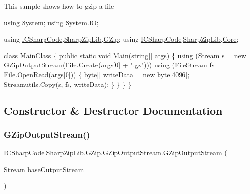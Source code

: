 This sample shows how to gzip a file 
\begin{DoxyCode}
\textcolor{keyword}{using} \hyperlink{namespace_system}{System};
\textcolor{keyword}{using} \hyperlink{namespace_system}{System}.\hyperlink{namespace_system_1_1_i_o}{IO};

\textcolor{keyword}{using} \hyperlink{namespace_i_c_sharp_code}{ICSharpCode}.\hyperlink{namespace_i_c_sharp_code_1_1_sharp_zip_lib}{SharpZipLib}.\hyperlink{namespace_i_c_sharp_code_1_1_sharp_zip_lib_1_1_g_zip}{GZip};
\textcolor{keyword}{using} \hyperlink{namespace_i_c_sharp_code}{ICSharpCode}.\hyperlink{namespace_i_c_sharp_code_1_1_sharp_zip_lib}{SharpZipLib}.\hyperlink{namespace_i_c_sharp_code_1_1_sharp_zip_lib_1_1_core}{Core};

\textcolor{keyword}{class }MainClass
\{
    \textcolor{keyword}{public} \textcolor{keyword}{static} \textcolor{keywordtype}{void} Main(\textcolor{keywordtype}{string}[] args)
    \{
            \textcolor{keyword}{using} (Stream s = \textcolor{keyword}{new} \hyperlink{class_i_c_sharp_code_1_1_sharp_zip_lib_1_1_g_zip_1_1_g_zip_output_stream_a8de4b46c4dd775a076c373ab46faabd8}{GZipOutputStream}(File.Create(args[0] + \textcolor{stringliteral}{".gz"})))
            \textcolor{keyword}{using} (FileStream fs = File.OpenRead(args[0])) \{
                byte[] writeData = \textcolor{keyword}{new} byte[4096];
                Streamutils.Copy(s, fs, writeData);
            \}
        \}
    \}
\}   
\end{DoxyCode}
 

\subsection{Constructor \& Destructor Documentation}
\mbox{\label{class_i_c_sharp_code_1_1_sharp_zip_lib_1_1_g_zip_1_1_g_zip_output_stream_a8de4b46c4dd775a076c373ab46faabd8}} 
\subsubsection{\texorpdfstring{G\+Zip\+Output\+Stream()}{GZipOutputStream()}\hspace{0.1cm}{\footnotesize\ttfamily [1/2]}}
{\footnotesize\ttfamily I\+C\+Sharp\+Code.\+Sharp\+Zip\+Lib.\+G\+Zip.\+G\+Zip\+Output\+Stream.\+G\+Zip\+Output\+Stream (\begin{DoxyParamCaption}\item[{Stream}]{base\+Output\+Stream }\end{DoxyParamCaption})\hspace{0.3cm}{\ttfamily [inline]}}



